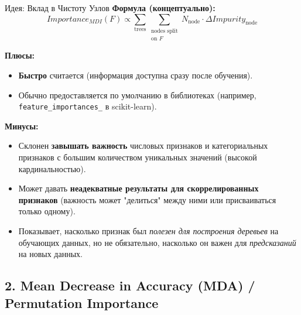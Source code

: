 \begin{myblock}{Идея: Вклад в Чистоту Узлов}
    \textbf{Формула (концептуально):}
    \[
    Importance_{MDI}(F) \propto \sum_{\text{trees}} \sum_{\substack{\text{nodes split} \\ \text{on } F}} N_{\text{node}} \cdot \Delta Impurity_{\text{node}}
    \]

    \textbf{Плюсы:}
    \begin{itemize}
        \item \textbf{Быстро} считается (информация доступна сразу после обучения).
        \item Обычно предоставляется по умолчанию в библиотеках (например, \texttt{feature\_importances\_} в scikit-learn).
    \end{itemize}
    \textbf{Минусы:}
    \begin{itemize}
        \item Склонен \textbf{завышать важность} числовых признаков и категориальных признаков с большим количеством уникальных значений (высокой кардинальностью).
        \item Может давать \textbf{неадекватные результаты для скоррелированных признаков} (важность может "делиться" между ними или присваиваться только одному).
        \item Показывает, насколько признак был \textit{полезен для построения деревьев} на обучающих данных, но не обязательно, насколько он важен для \textit{предсказаний} на новых данных.
    \end{itemize}
\end{myblock}

\subsection{2. Mean Decrease in Accuracy (MDA) / Permutation Importance}

